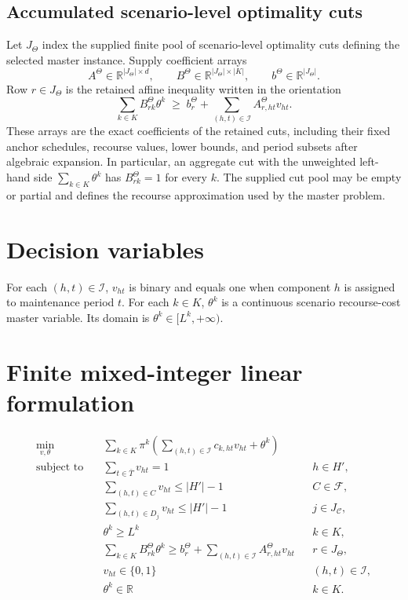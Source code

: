 \documentclass[11pt]{article}
\begin{document}
\subsection{Accumulated scenario-level optimality cuts}
Let $J_{\Theta}$ index the supplied finite pool of scenario-level optimality cuts defining the selected master instance. Supply coefficient arrays
\[
A^{\Theta}\in\mathbb R^{|J_{\Theta}|\times d},\qquad
B^{\Theta}\in\mathbb R^{|J_{\Theta}|\times|K|},\qquad
b^{\Theta}\in\mathbb R^{|J_{\Theta}|}.
\]
Row $r\in J_{\Theta}$ is the retained affine inequality written in the orientation
\[
\sum_{k\in K}B^{\Theta}_{rk}\theta^k
\;\geq\;
b^{\Theta}_r+
\sum_{(h,t)\in\mathcal I}A^{\Theta}_{r,ht}v_{ht}.
\]
These arrays are the exact coefficients of the retained cuts, including their fixed anchor schedules, recourse values, lower bounds, and period subsets after algebraic expansion. In particular, an aggregate cut with the unweighted left-hand side $\sum_{k\in K}\theta^k$ has $B^{\Theta}_{rk}=1$ for every $k$. The supplied cut pool may be empty or partial and defines the recourse approximation used by the master problem.

\section{Decision variables}
For each $(h,t)\in\mathcal I$, $v_{ht}$ is binary and equals one when component $h$ is assigned to maintenance period $t$. For each $k\in K$, $\theta^k$ is a continuous scenario recourse-cost master variable. Its domain is $\theta^k\in[L^k,+\infty)$.

\section{Finite mixed-integer linear formulation}
\begin{align}
\min_{v,\theta}\quad
 &\sum_{k\in K}\pi^k
 \left(\sum_{(h,t)\in\mathcal I}c_{k,ht}v_{ht}+\theta^k\right)
 \label{eq:objective}\\
\text{subject to}\quad
 &\sum_{t\in\bar T}v_{ht}=1
 &&h\in H',\label{eq:assignment}\\
 &\sum_{(h,t)\in C}v_{ht}\leq |H'|-1
 &&C\in\mathscr F,\label{eq:exact-reliability}\\
 &\sum_{(h,t)\in D_j}v_{ht}\leq |H'|-1
 &&j\in J_{\mathcal C},\label{eq:accumulated-covers}\\
 &\theta^k\geq L^k
 &&k\in K,\label{eq:lower-bounds}\\
 &\sum_{k\in K}B^{\Theta}_{rk}\theta^k
 \geq b^{\Theta}_r+
 \sum_{(h,t)\in\mathcal I}A^{\Theta}_{r,ht}v_{ht}
 &&r\in J_{\Theta},\label{eq:optimality-cuts}\\
 &v_{ht}\in\{0,1\}
 &&(h,t)\in\mathcal I,\\
 &\theta^k\in\mathbb R
 &&k\in K.
\end{align}
\end{document}
